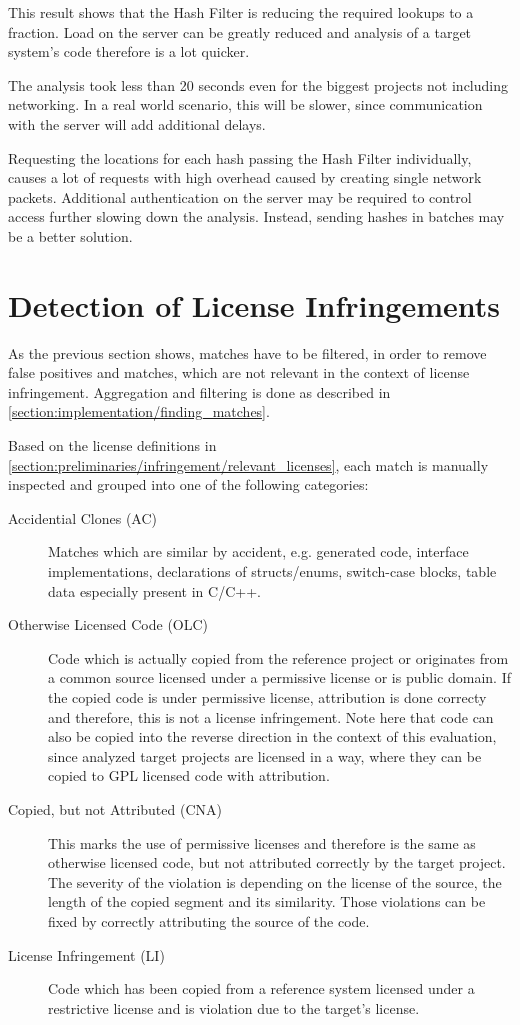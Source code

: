 This result shows that the Hash Filter is reducing the required lookups to a fraction.
Load on the server can be greatly reduced and analysis of a target system's code therefore is a lot quicker.

The analysis took less than 20 seconds even for the biggest projects not including networking.
In a real world scenario, this will be slower, since communication with the server will add additional delays.

Requesting the locations for each hash passing the Hash Filter individually, causes a lot of requests with high overhead caused by creating single network packets.
Additional authentication on the server may be required to control access further slowing down the analysis.
Instead, sending hashes in batches may be a better solution.

\newpage
\section{Detection of License Infringements}\label{section:evaluation/detecting_infringements}
As the previous section shows, matches have to be filtered, in order to remove false positives and matches, which are not relevant in the context of license infringement.
Aggregation and filtering is done as described in \autoref{section:implementation/finding_matches}.

Based on the license definitions in \autoref{section:preliminaries/infringement/relevant_licenses}, each match is manually inspected and grouped into one of the following categories:
\begin{description}
	\item [Accidential Clones (AC)]
		Matches which are similar by \glqq accident\grqq, e.g. generated code, interface implementations, declarations of structs/enums, switch-case blocks, table data especially present in C/C++.
	\item[Otherwise Licensed Code (OLC)]
		Code which is actually copied from the reference project or originates from a common source licensed under a permissive license or is public domain.
		If the copied code is under permissive license, attribution is done correcty and therefore, this is not a license infringement.
		Note here that code can also be copied into the reverse direction in the context of this evaluation, since analyzed target projects are licensed in a way, where they can be copied to GPL licensed code with attribution.
	\item[Copied, but not Attributed (CNA)]
		This marks the use of permissive licenses and therefore is the same as otherwise licensed code, but not attributed correctly by the target project.
		The severity of the violation is depending on the license of the source, the length of the copied segment and its similarity.
		Those violations can be fixed by correctly attributing the source of the code.
	\item[License Infringement (LI)]
		Code which has been copied from a reference system licensed under a restrictive license and is violation due to the target's license.
\end{description}

